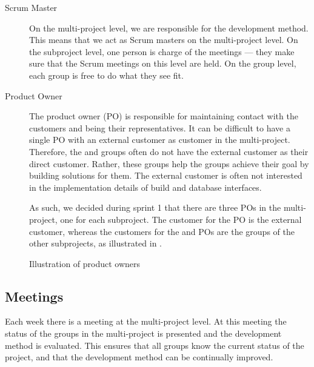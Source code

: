 \begin{description}
  \item[Scrum Master] On the multi-project level, we are responsible for the development method. This means that we act as Scrum masters on the multi-project level. On the subproject level, one person is charge of the meetings --- they make sure that the Scrum meetings on this level are held. On the group level, each group is free to do what they see fit.
  \item[Product Owner] The product owner (PO) is responsible for maintaining contact with the customers and being their representatives. It can be difficult to have a single PO with an external customer as customer in the multi-project. Therefore, the \bd and \db groups often do not have the external customer as their direct customer. Rather, these groups help the \gui groups achieve their goal by building solutions for them. The external customer is often not interested in the implementation details of build and database interfaces.

As such, we decided during sprint 1 that there are three POs in the multi-project, one for each subproject. The customer for the \gui PO is the external customer, whereas the customers for the \db and \bd POs are the groups of the other subprojects, as illustrated in .

\end{description}

\begin{figure}%
\centering
{}
\caption{Illustration of product owners}%
\label{fig:po_illu}%
\end{figure}


\subsection{Meetings}\label{sec:meetings}
Each week there is a meeting at the multi-project level. At this meeting the status of the groups in the multi-project is presented and the development method is evaluated. This ensures that all groups know the current status of the project, and that the development method can be continually improved.


